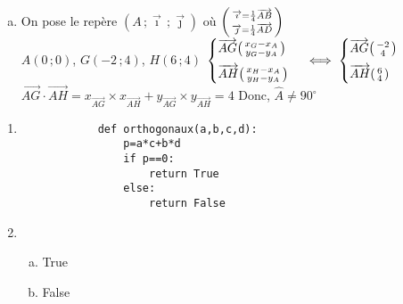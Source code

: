\documentclass[12pt, a4paper]{article}
\begin{document}
\begin{Exercise}[number={74}]
    \begin{enumerate}[a)]
     \item On pose le repère $(A\, ;\overrightarrow{\imath}\,;\overrightarrow{\jmath})$ où $\begin{psmallmatrix}\overrightarrow{\imath}=\frac{1}{4}\overrightarrow{AB}\\\overrightarrow{\jmath}=\frac{1}{4}\overrightarrow{AD}\end{psmallmatrix}$ \smallskip \\
        $A(0\,;0)$, $G(-2\,;4)$, $H(6\,;4)$ \medbreak
        $\begin{cases}\overrightarrow{AG}\begin{psmallmatrix}x_G-x_A\\y_G-y_A\end{psmallmatrix}\\[0.2cm]\overrightarrow{AH}\begin{psmallmatrix}x_H-x_A\\y_H-y_A\end{psmallmatrix}\end{cases} \iff\begin{cases}\overrightarrow{AG}\begin{psmallmatrix}-2\\4\end{psmallmatrix}\\[0.2cm]\overrightarrow{AH}\begin{psmallmatrix}6\\4\end{psmallmatrix}\end{cases}$ \medbreak
        $\overrightarrow{AG}\cdot\overrightarrow{AH}=x_{\overrightarrow{AG}}\times x_{\overrightarrow{AH}}+y_{\overrightarrow{AG}}\times y_{\overrightarrow{AH}}=4$ \qquad Donc, $\widehat{A}\neq 90^{\circ}$
    \end{enumerate}
\end{Exercise}

\begin{Exercise}[number={78}]
    \begin{enumerate}[1)]
        \item \begin{verbatim}
            def orthogonaux(a,b,c,d):
                p=a*c+b*d
                if p==0:
                    return True
                else:
                    return False
        \end{verbatim}
        \item \begin{enumerate}[a)]
                    \item True
                    \item False
                    \end{enumerate}
    \end{enumerate}
\end{Exercise}
\end{document}
